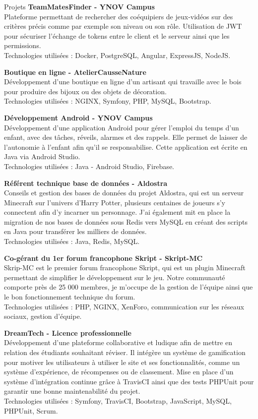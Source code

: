 \documentclass[
	10pt, %
]{resume} %
\begin{document}
\begin{rSection}{Projets}
	{\bf TeamMatesFinder - YNOV Campus}
	\\Plateforme permettant de rechercher des coéquipiers de jeux-vidéos sur des critères précis comme par exemple son niveau ou son rôle. Utilisation de JWT pour sécuriser l'échange de tokens entre le client et le serveur ainsi que les permissions.
	\\ Technologies utilisées : Docker, PostgreSQL, Angular, ExpressJS, NodeJS.

	{\bf Boutique en ligne - AtelierCausseNature}
	\\Développement d'une boutique en ligne d'un artisant qui travaille avec le bois pour produire des bijoux ou des objets de décoration.
	\\ Technologies utilisées : NGINX, Symfony, PHP, MySQL, Bootstrap.

	{\bf Développement Android - YNOV Campus}
	\\Développement d'une application Android pour gérer l'emploi du temps d'un enfant, avec des tâches, réveils, alarmes et des rappels. 
	Elle permet de laisser de l'autonomie à l'enfant afin qu'il se responsabilise. Cette application est écrite en Java via Android Studio.
	\\ Technologies utilisées : Java - Android Studio, Firebase.

	{\bf Référent technique base de données - Aldostra}
	\\Conseils et gestion des bases de données du projet Aldostra, qui est un serveur Minecraft sur l'univers d'Harry Potter, plusieurs centaines de joueurs s'y connectent afin d'y incarner un personnage. J'ai également mit en place la migration de nos bases de données sous Redis vers MySQL en créant des scripts en Java pour transférer les milliers de données.
	\\ Technologies utilisées : Java, Redis, MySQL.

	{\bf Co-gérant du 1er forum francophone Skript - Skript-MC}
	\\Skrip-MC est le premier forum francophone Skript, qui est un plugin Minecraft permettant de simplifier le développement sur le jeu. 
	Notre communauté comporte près de 25 000 membres, je m'occupe de la gestion de l'équipe ainsi que le bon fonctionnement technique du forum.
	\\ Technologies utilisées : PHP, NGINX, XenForo, communication sur les réseaux sociaux, gestion d'équipe.

	{\bf DreamTech - Licence professionnelle}
	\\Développement d'une plateforme collaborative et ludique afin de mettre en relation des étudiants souhaitant réviser. 
	Il intégère un système de gamification pour motiver les utilisateurs à utiliser le site et ses fonctionnalités, comme un système d'expérience, de récompenses ou de classement. 
	Mise en place d'un système d'intégration continue grâce à TravisCI ainsi que des tests PHPUnit pour garantir une bonne maintenabilité du projet.
	\\ Technologies utilisées : Symfony, TravisCI, Bootstrap, JavaScript, MySQL, PHPUnit, Scrum.

\end{rSection}
\end{document}
